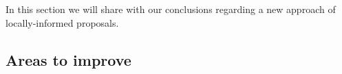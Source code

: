 In this section we will share with our conclusions regarding a new approach of locally-informed proposals.

\subsection{Areas to improve}